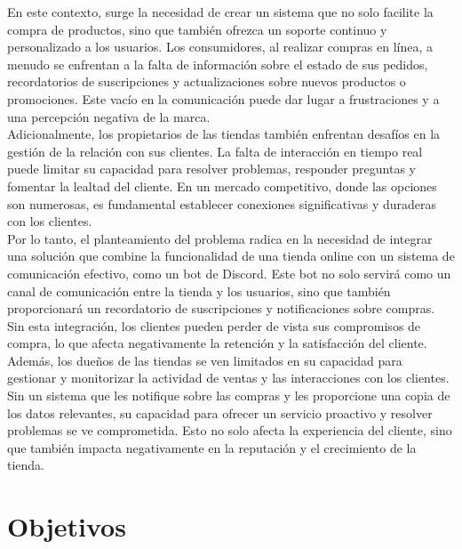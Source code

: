 \documentclass[a4paper,12pt]{article}
\begin{document}
En este contexto, surge la necesidad de crear un sistema que no solo facilite la compra de productos, sino que también ofrezca un soporte continuo y personalizado a los usuarios. Los consumidores, al realizar compras en línea, a menudo se enfrentan a la falta de información sobre el estado de sus pedidos, recordatorios de suscripciones y actualizaciones sobre nuevos productos o promociones. Este vacío en la comunicación puede dar lugar a frustraciones y a una percepción negativa de la marca.\\

Adicionalmente, los propietarios de las tiendas también enfrentan desafíos en la gestión de la relación con sus clientes. La falta de interacción en tiempo real puede limitar su capacidad para resolver problemas, responder preguntas y fomentar la lealtad del cliente. En un mercado competitivo, donde las opciones son numerosas, es fundamental establecer conexiones significativas y duraderas con los clientes.\\

Por lo tanto, el planteamiento del problema radica en la necesidad de integrar una solución que combine la funcionalidad de una tienda online con un sistema de comunicación efectivo, como un bot de Discord. Este bot no solo servirá como un canal de comunicación entre la tienda y los usuarios, sino que también proporcionará un recordatorio de suscripciones y notificaciones sobre compras. Sin esta integración, los clientes pueden perder de vista sus compromisos de compra, lo que afecta negativamente la retención y la satisfacción del cliente.\\

Además, los dueños de las tiendas se ven limitados en su capacidad para gestionar y monitorizar la actividad de ventas y las interacciones con los clientes. Sin un sistema que les notifique sobre las compras y les proporcione una copia de los datos relevantes, su capacidad para ofrecer un servicio proactivo y resolver problemas se ve comprometida. Esto no solo afecta la experiencia del cliente, sino que también impacta negativamente en la reputación y el crecimiento de la tienda.
\newpage

\section{Objetivos}
\end{document}
